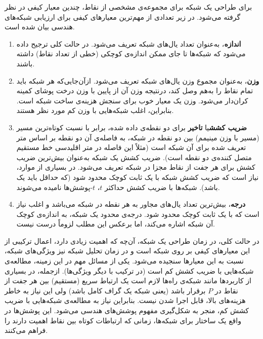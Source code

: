 برای طراحی یک شبکه برای مجموعه‌ی مشخصی از نقاط، چندین معیار کیفی در نظر گرفته می‌شود. در زیر تعدادی از مهم‌ترین معیارهای کیفی برای ارزیابی شبکه‌های هندسی بیان شده است.
 \begin{enumerate}
\item
\textbf{اندازه}، به‌عنوان تعداد یال‌های شبکه تعریف می‌شود. در حالت کلی ترجیح داده می‌شود که شبکه‌ها تا جای ممکن اندازه‌ی کوچکی (خطی از تعداد نقاط) داشته باشند. 
\item
\textbf{وزن}، به‌عنوان مجموع وزن یال‌های شبکه تعریف می‌شود. ازآن‌جایی‌که هر شبکه باید تمام نقاط را به‌هم وصل کند، درنتیجه وزن آن از پایین با وزن درخت پوشای کمینه کران‌دار می‌شود. وزن یک معیار خوب برای سنجش هزینه‌ی ساخت شبکه است. بنابراین، اغلب شبکه‌هایی با وزن کم مورد نظر هستند.
\item
\textbf{ضریب کشش}یا \textbf{تاخیر}  برای دو نقطه‌ی داده شده، برابر با نسبت کوتاه‌ترین مسیر (مسیر با وزن مینیمم) بین دو نقطه در شبکه، به فاصله‌ی آن دو نقطه بر اساس متر تعریف شده برای آن شبکه است (مثلاً این فاصله در متر اقلیدسی خط مستقیم متصل کننده‌ی دو نقطه است). ضریب کشش یک شبکه به‌عنوان بیش‌ترین ضریب کشش برای هر جفت از نقاط مجزا در شبکه تعریف می‌شود. در بسیاری از موارد، نیاز است که ضریب کشش شبکه با یک ثابت کوچک محدود شود (که حداقل باید یک باشد). شبکه‌ها با ضریب کشش حداکثر $t$، $t$-پوشش‌ها نامیده می‌شوند.
\item
\textbf{درجه}،  بیش‌ترین تعداد یال‌های مجاور به هر نقطه در شبکه می‌باشد و اغلب نیاز است که با یک ثابت کوچک محدود شود. درجه‌ی محدود یک شبکه، به اندازه‌ی کوچک آن شبکه اشاره می‌کند، اما برعکس این مطلب لزوماً درست نیست.
\end{enumerate}
در حالت کلی، در زمان طراحی یک شبکه، آن‌چه که اهمیت زیادی دارد، اعمال ترکیبی از این معیارهای کیفی بر روی شبکه است و در زمان تحلیل شبکه نیز ویژگی‌های شبکه، نسبت به این معیارها سنجیده می‌شود. یکی از مسائل مهم در این زمینه، مطالعه‌ی شبکه‌هایی با ضریب کشش کم است (در ترکیب با دیگر ویژگی‌ها). ازجمله، در بسیاری از کاربردها مانند شبکه‌ی راه‌ها لازم است یک ارتباط سریع (مستقیم) بین هر جفت از نقاط در $P$ برقرار باشد (یعنی شبکه یک گراف کامل باشد) ولی این نیاز به خاطر هزینه‌های بالا، قابل اجرا شدن نیست. بنابراین نیاز به مطالعه‌ی شبکه‌هایی با ضریب کشش کم، منجر به شکل‌گیری مفهوم پوشش‌های هندسی می‌شود. این پوشش‌ها در واقع یک ساختار برای شبکه‌ها، زمانی که ارتباطات کوتاه بین نقاط اهمیت دارند را فراهم می‌کنند.
